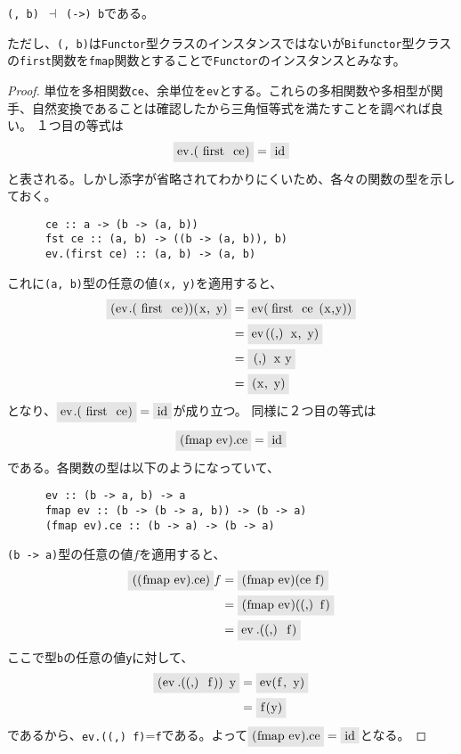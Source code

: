 \documentclass[uplatex,dvipdfmx]{jsarticle}
\newcommand{\pr}[1]{\colorbox[rgb]{0.9,0.9,0.9}{\lstinline{#1}}}
\begin{document}
  \begin{prop}[べき随伴]\label{prop-h-has-exp-adjoint}
    \pr{(, b)}\ $\dashv $\ \pr{(->) b}である。

    ただし、\pr{(, b)}は\pr{Functor}型クラスのインスタンスではないが\pr{Bifunctor}型クラスの\pr{first}関数を\pr{fmap}関数とすることで\pr{Functor}のインスタンスとみなす。
  \end{prop}
  \begin{proof}
    単位を多相関数\pr{ce}、余単位を\pr{ev}とする。これらの多相関数や多相型が関手、自然変換であることは確認したから三角恒等式を満たすことを調べれば良い。
    １つ目の等式は\[\pr{ev.(first ce)}=\pr{id}\]と表される。しかし添字が省略されてわかりにくいため、各々の関数の型を示しておく。
    \begin{lstlisting}
      ce :: a -> (b -> (a, b))
      fst ce :: (a, b) -> ((b -> (a, b)), b)
      ev.(first ce) :: (a, b) -> (a, b)
    \end{lstlisting}
    これに\pr{(a, b)}型の任意の値\pr{(x, y)}を適用すると、
    \begin{align*}
      \pr{(ev.(first ce))(x, y)}&=\pr{ev(first ce (x,y))}\\
      &=\pr{ev((,) x, y)}\\
      &=\pr{(,) x y}\\
      &=\pr{(x, y)}
    \end{align*}
    となり、$\pr{ev.(first ce)}=\pr{id}$が成り立つ。
    同様に２つ目の等式は\[\pr{(fmap ev).ce}=\pr{id}\]である。各関数の型は以下のようになっていて、
    \begin{lstlisting}
      ev :: (b -> a, b) -> a
      fmap ev :: (b -> (b -> a, b)) -> (b -> a)
      (fmap ev).ce :: (b -> a) -> (b -> a)
    \end{lstlisting}
    \pr{(b -> a)}型の任意の値$f$を適用すると、
    \begin{align*}
      \pr{((fmap ev).ce)} f &= \pr{(fmap ev)(ce f)}\\
      &=\pr{(fmap ev)((,) f)}\\
      &=\pr{ev.((,) f)}\\
    \end{align*}
    ここで型\pr{b}の任意の値\pr{y}に対して、\\
    \begin{align*}
      \pr{(ev.((,) f)) y} &= \pr{ev(f, y)}\\
      &= \pr{f(y)}\\
    \end{align*}
    であるから、\pr{ev.((,) f)}=\pr{f}である。よって$\pr{(fmap ev).ce}=\pr{id}$となる。
  \end{proof}
\end{document}
